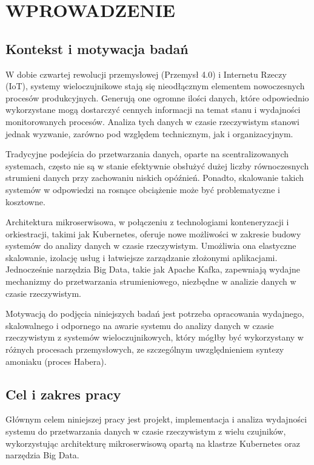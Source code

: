 \section{WPROWADZENIE}
\label{sec:wprowadzenie}

\subsection{Kontekst i motywacja badań}
\label{subsec:kontekst}

W dobie czwartej rewolucji przemysłowej (Przemysł 4.0) i Internetu Rzeczy (IoT), systemy wieloczujnikowe stają się nieodłącznym elementem nowoczesnych procesów produkcyjnych. Generują one ogromne ilości danych, które odpowiednio wykorzystane mogą dostarczyć cennych informacji na temat stanu i wydajności monitorowanych procesów. Analiza tych danych w czasie rzeczywistym stanowi jednak wyzwanie, zarówno pod względem technicznym, jak i organizacyjnym.

Tradycyjne podejścia do przetwarzania danych, oparte na scentralizowanych systemach, często nie są w stanie efektywnie obsłużyć dużej liczby równoczesnych strumieni danych przy zachowaniu niskich opóźnień. Ponadto, skalowanie takich systemów w odpowiedzi na rosnące obciążenie może być problematyczne i kosztowne.

Architektura mikroserwisowa, w połączeniu z technologiami konteneryzacji i orkiestracji, takimi jak Kubernetes, oferuje nowe możliwości w zakresie budowy systemów do analizy danych w czasie rzeczywistym. Umożliwia ona elastyczne skalowanie, izolację usług i łatwiejsze zarządzanie złożonymi aplikacjami. Jednocześnie narzędzia Big Data, takie jak Apache Kafka, zapewniają wydajne mechanizmy do przetwarzania strumieniowego, niezbędne w analizie danych w czasie rzeczywistym.

Motywacją do podjęcia niniejszych badań jest potrzeba opracowania wydajnego, skalowalnego i odpornego na awarie systemu do analizy danych w czasie rzeczywistym z systemów wieloczujnikowych, który mógłby być wykorzystany w różnych procesach przemysłowych, ze szczególnym uwzględnieniem syntezy amoniaku (proces Habera).

\subsection{Cel i zakres pracy}
\label{subsec:cel}

Głównym celem niniejszej pracy jest projekt, implementacja i analiza wydajności systemu do przetwarzania danych w czasie rzeczywistym z wielu czujników, wykorzystując architekturę mikroserwisową opartą na klastrze Kubernetes oraz narzędzia Big Data.

